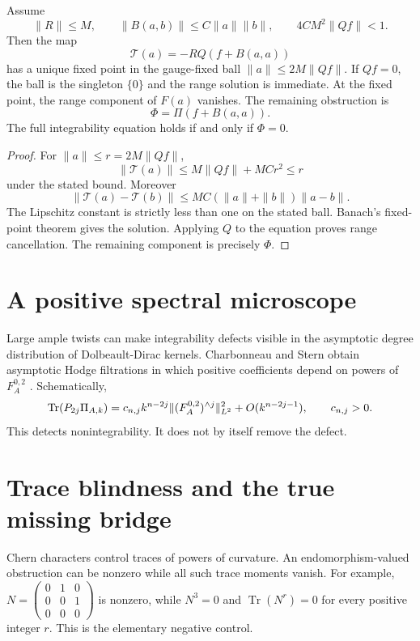 \begin{theorem}
Assume
\[
\|R\|\le M,
\qquad
\|B(a,b)\|\le C\|a\|\|b\|,
\qquad
4CM^2\|Qf\|<1.
\]
Then the map
\[
\mathcal T(a)=-RQ(f+B(a,a))
\]
has a unique fixed point in the gauge-fixed ball $\|a\|\le2M\|Qf\|$. If $Qf=0$, the ball is the singleton $\{0\}$ and the range solution is immediate. At the fixed point, the range component of $F(a)$ vanishes. The remaining obstruction is
\[
\Phi=\Pi(f+B(a,a)).
\]
The full integrability equation holds if and only if $\Phi=0$.
\end{theorem}
\begin{proof}
For $\|a\|\le r=2M\|Qf\|$,
\[
\|\mathcal T(a)\|\le M\|Qf\|+MC r^2\le r
\]
under the stated bound. Moreover
\[
\|\mathcal T(a)-\mathcal T(b)\|
\le MC(\|a\|+\|b\|)\|a-b\|.
\]
The Lipschitz constant is strictly less than one on the stated ball.
Banach's fixed-point theorem gives the solution. Applying $Q$ to the equation proves range cancellation. The remaining component is precisely $\Phi$.
\end{proof}





\section{A positive spectral microscope}
Large ample twists can make integrability defects visible in the asymptotic degree distribution of Dolbeault-Dirac kernels. Charbonneau and Stern obtain asymptotic Hodge filtrations in which positive coefficients depend on powers of $F_A^{0,2}$ \cite{CharbonneauStern}. Schematically,
\[
\operatorname{Tr}(P_{2j}\Pi_{A,k})
=c_{n,j}k^{n-2j}\|(F_A^{0,2})^{\wedge j}\|_{L^2}^2+O(k^{n-2j-1}),
\qquad c_{n,j}>0.
\]
This detects nonintegrability. It does not by itself remove the defect.



\section{Trace blindness and the true missing bridge}
Chern characters control traces of powers of curvature. An endomorphism-valued obstruction can be nonzero while all such trace moments vanish. For example, $N=\left(\begin{smallmatrix}0&1&0\\0&0&1\\0&0&0\end{smallmatrix}\right)$ is nonzero, while $N^3=0$ and $\operatorname{Tr}(N^r)=0$ for every positive integer $r$. This is the elementary negative control.



